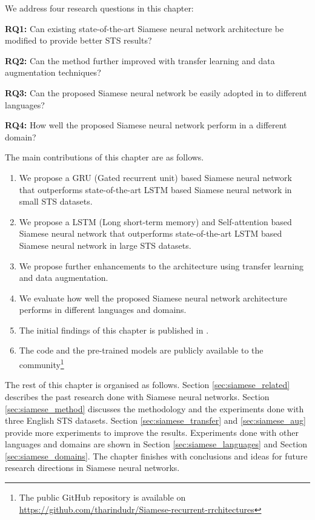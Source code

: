 We address four research questions in this chapter:

\textbf{RQ1:} Can existing state-of-the-art Siamese neural network architecture be modified to provide better STS results?

\textbf{RQ2:} Can the method further improved with transfer learning and data augmentation techniques?

\textbf{RQ3:} Can the proposed Siamese neural network be easily adopted in to different languages?

\textbf{RQ4:} How well the proposed Siamese neural network perform in a different domain? 


The main contributions of this chapter are as follows.

\begin{enumerate}
	\item We propose a GRU (Gated recurrent unit) based Siamese neural network that outperforms state-of-the-art LSTM based Siamese neural network in small STS datasets. 
	
	\item We propose a LSTM (Long short-term memory) and Self-attention based Siamese neural network that outperforms state-of-the-art LSTM based Siamese neural network in large STS datasets.
	
	\item We propose further enhancements to the architecture using transfer learning and data augmentation.  
	
	\item We evaluate how well the proposed Siamese neural network architecture performs in different languages and domains. 
	
	\item The initial findings of this chapter is published in \citet{ranasinghe-etal-2019-semantic}. 
	
	\item The code and the pre-trained models are publicly available to the community\footnote{The public GitHub repository is available on \url{https://github.com/tharindudr/Siamese-recurrent-rrchitectures}}
\end{enumerate}


The rest of this chapter is organised as follows. Section \ref{sec:siamese_related} describes the past research done with Siamese neural networks. Section \ref{sec:siamese_method} discusses the methodology and the experiments done with three English STS datasets. Section \ref{sec:siamese_transfer} and \ref{sec:siamese_aug} provide more experiments to improve the results. Experiments done with other languages and domains are shown in Section \ref{sec:siamese_languages} and Section \ref{sec:siamese_domains}. The chapter finishes with conclusions and ideas for future research directions in Siamese neural networks. 


